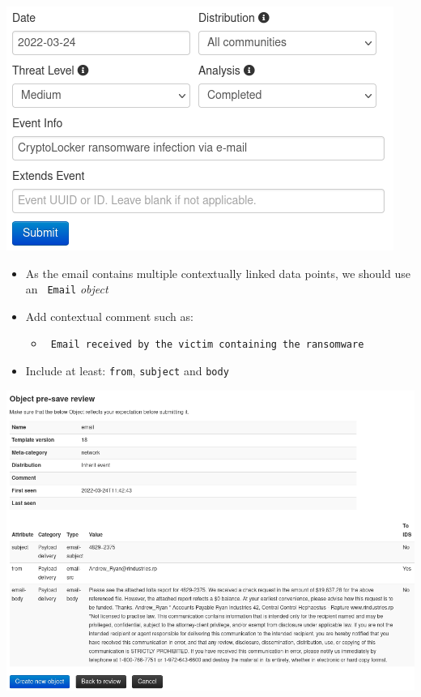 \begin{frame}
    \includegraphics[width=1.0\linewidth]{pictures/case2/event.png}
\end{frame}

\begin{frame}
    \begin{itemize}
        \item As the email contains multiple contextually linked data points, we should use an \texttt{\color{black} Email} \textit{object}
        \item Add contextual comment such as:
        \begin{itemize}
            \item \texttt{\color{black} Email received by the victim containing the ransomware}
        \end{itemize}
        \item Include at least: \texttt{from}, \texttt{subject} and \texttt{body}
    \end{itemize}
\end{frame}

\begin{frame}
    \begin{center}
        \includegraphics[width=0.88\linewidth]{pictures/case2/object-mail.png}
    \end{center}
\end{frame}


